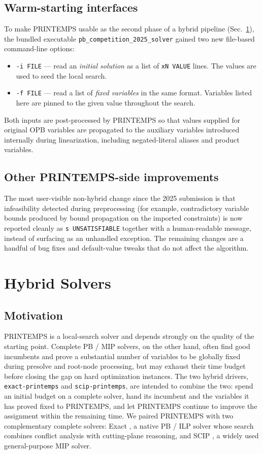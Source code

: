 \documentclass[conference]{IEEEtran}
\begin{document}
\subsection{Warm-starting interfaces}\label{sec:warm-start}
To make PRINTEMPS usable as the second phase of a hybrid pipeline (Sec.~\ref{sec:hybrid}), the bundled executable \texttt{pb\_competition\_2025\_solver} gained two new file-based command-line options:
\begin{itemize}
\item \texttt{-i FILE} --- read an \emph{initial solution} as a list of \texttt{xN VALUE} lines. The values are used to seed the local search.
\item \texttt{-f FILE} --- read a list of \emph{fixed variables} in the same format. Variables listed here are pinned to the given value throughout the search.
\end{itemize}
Both inputs are post-processed by PRINTEMPS so that values supplied for original OPB variables are propagated to the auxiliary variables introduced internally during linearization, including negated-literal aliases and product variables.

\subsection{Other PRINTEMPS-side improvements}\label{sec:other}
The most user-visible non-hybrid change since the 2025 submission is that infeasibility detected during preprocessing (for example, contradictory variable bounds produced by bound propagation on the imported constraints) is now reported cleanly as \texttt{s UNSATISFIABLE} together with a human-readable message, instead of surfacing as an unhandled exception. The remaining changes are a handful of bug fixes and default-value tweaks that do not affect the algorithm.

\section{Hybrid Solvers}\label{sec:hybrid}

\subsection{Motivation}
PRINTEMPS is a local-search solver and depends strongly on the quality of the starting point. Complete PB / MIP solvers, on the other hand, often find good incumbents and prove a substantial number of variables to be globally fixed during presolve and root-node processing, but may exhaust their time budget before closing the gap on hard optimization instances. The two hybrid drivers, \texttt{exact-printemps} and \texttt{scip-printemps}, are intended to combine the two: spend an initial budget on a complete solver, hand its incumbent and the variables it has proved fixed to PRINTEMPS, and let PRINTEMPS continue to improve the assignment within the remaining time. We paired PRINTEMPS with two complementary complete solvers: Exact \cite{exact}, a native PB / ILP solver whose search combines conflict analysis with cutting-plane reasoning, and SCIP \cite{scip}, a widely used general-purpose MIP solver.
\end{document}
